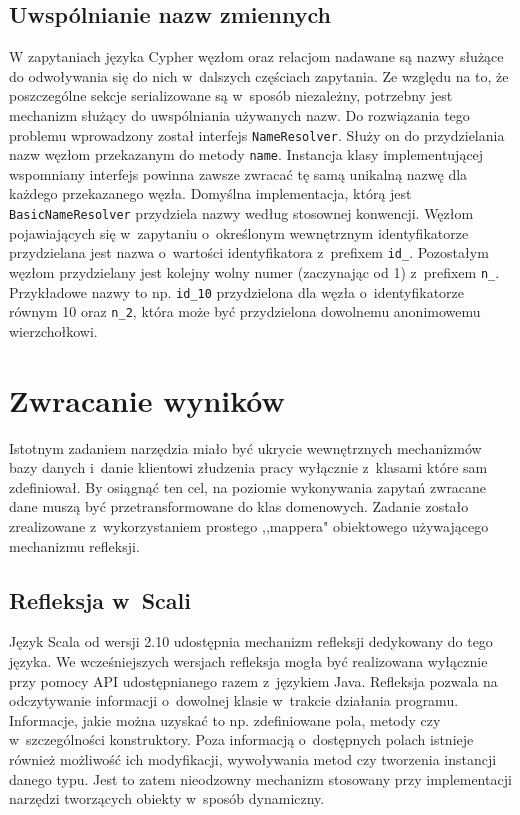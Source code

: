 \documentclass[brudnopis]{xmgr}
\begin{document}
\subsection{Uwspólnianie nazw zmiennych}

W zapytaniach języka Cypher węzłom oraz relacjom nadawane są nazwy służące do odwoływania się do nich w~dalszych częściach zapytania. Ze względu na to, że poszczególne sekcje serializowane są w~sposób niezależny, potrzebny jest mechanizm służący do uwspólniania używanych nazw. Do rozwiązania tego problemu wprowadzony został interfejs \texttt{NameResolver}. Służy on do przydzielania nazw węzłom przekazanym do metody \texttt{name}. Instancja klasy implementującej wspomniany interfejs powinna zawsze zwracać tę samą unikalną nazwę dla każdego przekazanego węzła. Domyślna implementacja, którą jest \texttt{BasicNameResolver} przydziela nazwy według stosownej konwencji. Węzłom pojawiających się w~zapytaniu o~określonym wewnętrznym identyfikatorze przydzielana jest nazwa o~wartości identyfikatora z~prefixem \texttt{id\_}. Pozostałym węzłom przydzielany jest kolejny wolny numer (zaczynając od 1) z~prefixem \texttt{n\_}. Przykładowe nazwy to np. \texttt{id\_10} przydzielona dla węzła o~identyfikatorze równym 10 oraz \texttt{n\_2}, która może być przydzielona dowolnemu anonimowemu wierzchołkowi.

\section{Zwracanie wyników}

Istotnym zadaniem narzędzia miało być ukrycie wewnętrznych mechanizmów bazy danych i~danie klientowi złudzenia pracy wyłącznie z~klasami które sam zdefiniował. By osiągnąć ten cel, na poziomie wykonywania zapytań zwracane dane muszą być przetransformowane do klas domenowych. Zadanie zostało zrealizowane z~wykorzystaniem prostego ,,mappera" obiektowego używającego mechanizmu refleksji.

\subsection{Refleksja w~Scali}

Język Scala od wersji 2.10 udostępnia mechanizm refleksji dedykowany do tego języka. We wcześniejszych wersjach refleksja mogła być realizowana wyłącznie przy pomocy API udostępnianego razem z~językiem Java. Refleksja pozwala na odczytywanie informacji o~dowolnej klasie w~trakcie działania programu. Informacje, jakie można uzyskać to np. zdefiniowane pola, metody czy w~szczególności konstruktory. Poza informacją o~dostępnych polach istnieje również możliwość ich modyfikacji, wywoływania metod czy tworzenia instancji danego typu. Jest to zatem nieodzowny mechanizm stosowany przy implementacji narzędzi tworzących obiekty w~sposób dynamiczny.
\end{document}
